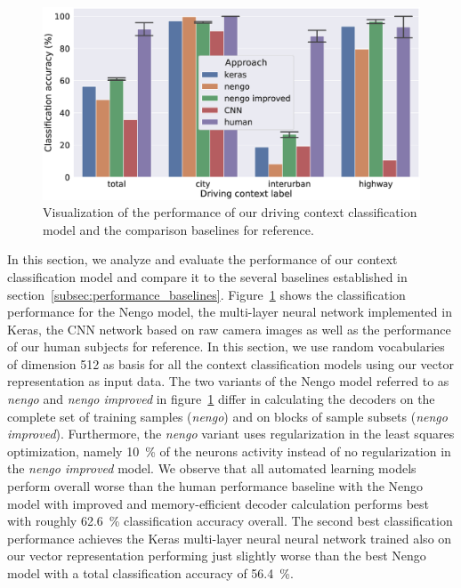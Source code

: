 \begin{figure}[t]
    \centering
    \includegraphics[width=1.\linewidth]{imgs/context_class_approaches.eps}
    \caption{Visualization of the performance of our driving context classification model and the comparison baselines for reference.}
    \label{fig:context_class_approaches}
\end{figure}

In this section, we analyze and evaluate the performance of our context classification model and compare it to the several baselines established in section~\ref{subsec:performance_baselines}.
Figure~\ref{fig:context_class_approaches} shows the classification performance for the \ac{Nengo} model, the multi-layer neural network implemented in Keras, the \ac{CNN} network based on raw camera images as well as the performance of our human subjects for reference.
In this section, we use random vocabularies of dimension \num{512} as basis for all the context classification models using our vector representation as input data.
The two variants of the \ac{Nengo} model referred to as \emph{nengo} and \emph{nengo improved} in figure~\ref{fig:context_class_approaches} differ in calculating the decoders on the complete set of training samples (\emph{nengo}) and on blocks of sample subsets (\emph{nengo improved}).
Furthermore, the \emph{nengo} variant uses regularization in the least squares optimization, namely \SI{10}{\percent} of the neurons activity instead of no regularization in the \emph{nengo improved} model.
We observe that all automated learning models perform overall worse than the human performance baseline with the \ac{Nengo} model with improved and memory-efficient decoder calculation performs best with roughly \SI{62.6}{\percent} classification accuracy overall.
The second best classification performance achieves the Keras multi-layer neural neural network trained also on our vector representation performing just slightly worse than the best \ac{Nengo} model with a total classification accuracy of \SI{56.4}{\percent}.

